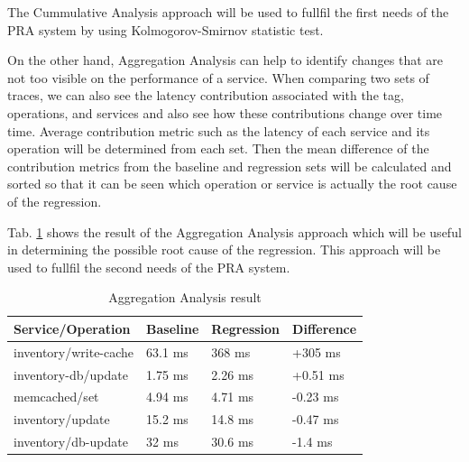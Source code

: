 \documentclass[conference]{configs/IEEEtran}
\begin{document}
The Cummulative Analysis approach will be used to fullfil the first needs of the PRA system by using Kolmogorov-Smirnov statistic test.

On the other hand, Aggregation Analysis can help to identify changes that are not too visible on the performance of a service. When comparing two sets of traces, we can also see the latency contribution associated with the tag,
operations, and services and also see how these contributions change over time time. Average contribution metric
such as the latency of each service and its operation will be determined from each set. Then the mean difference of the contribution metrics from the baseline and regression sets
will be calculated and sorted so that it can be seen which operation or service is actually the root cause of the regression.

Tab. \ref{aggregate} shows the result of the Aggregation Analysis approach which will be useful in determining the possible root cause of the regression. This approach will be used to fullfil the second needs of the PRA system.
\begin{table}[!htb]
	\caption{Aggregation Analysis result}
	\label{aggregate}
	\centering
	\begin{tabular}{|l|l|l|l|}
		\hline
		\textbf{Service/Operation} & \textbf{Baseline} & \textbf{Regression} & \textbf{Difference} \\ \hline
		inventory/write-cache & 63.1 ms & 368 ms  & +305 ms  \\ \hline
		inventory-db/update   & 1.75 ms & 2.26 ms & +0.51 ms \\ \hline
		memcached/set         & 4.94 ms & 4.71 ms & -0.23 ms \\ \hline
		inventory/update      & 15.2 ms & 14.8 ms & -0.47 ms \\ \hline
		inventory/db-update   & 32 ms   & 30.6 ms & -1.4 ms  \\ \hline
	\end{tabular}
\end{table}
\end{document}
